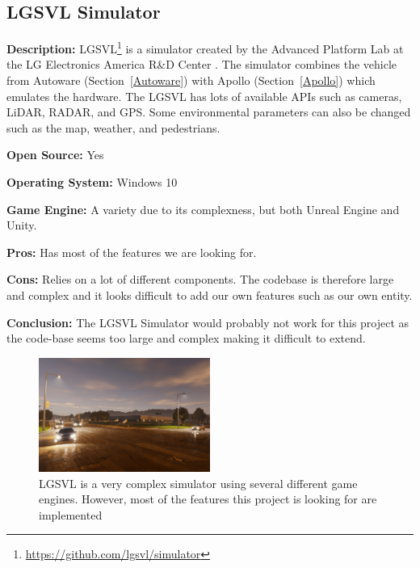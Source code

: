 \subsection{LGSVL Simulator} \label{LGSVL_Simulator}
\textbf{Description:} LGSVL\footnote{\url{https://github.com/lgsvl/simulator}} is a simulator created by the Advanced Platform Lab at the LG Electronics America R\&D Center \cite{LGSVL_Web}. The simulator combines the vehicle from Autoware (Section~\ref{Autoware}) with Apollo (Section~\ref{Apollo}) which emulates the hardware. The LGSVL has lots of available APIs such as cameras, LiDAR, RADAR, and GPS. Some environmental parameters can also be changed such as the map, weather, and pedestrians.

\textbf{Open Source:} Yes

\textbf{Operating System:} Windows 10

\textbf{Game Engine:} A variety due to its complexness, but both Unreal Engine and Unity.

\textbf{Pros:} Has most of the features we are looking for.

\textbf{Cons:} Relies on a lot of different components. The codebase is therefore large and complex and it looks difficult to add our own features such as our own entity.

\textbf{Conclusion:} The LGSVL Simulator would probably not work for this project as the code-base seems too large and complex making it difficult to extend.

\begin{figure}[H]
    \centering
    \includegraphics[width=0.5\textwidth]{03_Background/Appendix/Simulators/LGSVL.jpg}
    \caption[LGSVL Simulator]{LGSVL is a very complex simulator using several different game engines. However, most of the features this project is looking for are implemented}
\end{figure}

